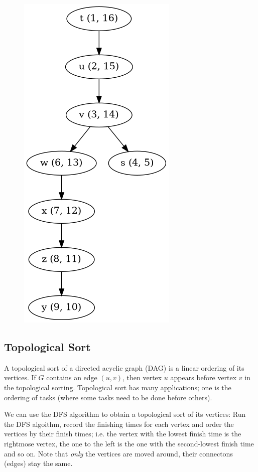 \begin{figure}[H]
\centering
\includegraphics[scale=0.4]{images/dfs_05.png}
\end{figure}


\subsection{Topological Sort}

A topological sort of a directed acyclic graph (DAG) is a linear ordering of its vertices. If $G$ contains an edge $(u,v)$, then vertex $u$ appears before vertex $v$ in the topological sorting. Topological sort has many applications; one is the ordering of tasks (where some tasks need to be done before others).

We can use the DFS algorithm to obtain a topological sort of its vertices: Run the DFS algoithm, record the finishing times for each vertex and order the vertices by their finish times; i.e. the vertex with the lowest finish time is the rightmose vertex, the one to the left is the one with the second-lowest finish time and so on. Note that \emph{only} the vertices are moved around, their connectons (edges) stay the same.

